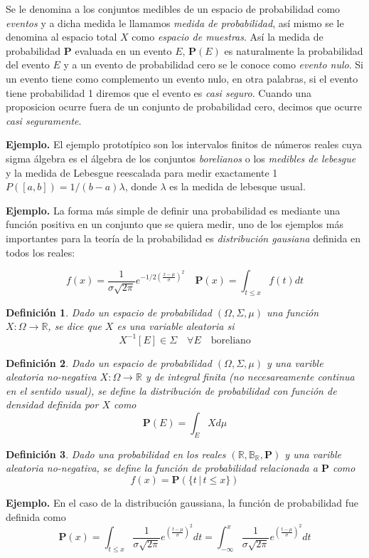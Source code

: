 \documentclass[letterpaper]{article}
\newtheorem{def.}{Definici\'on}[section]
\newcommand{\prob}{\textbf{P}}
\newcommand{\eje}{{\newline \noindent \sc \textbf{Ejemplo. }}}
\newcommand{\om}{\ensuremath{\Omega}}
\newcommand{\sig}{\ensuremath{\Sigma}}
\newcommand{\re}{\ensuremath{\mathbb R }}
\begin{document}
Se le denomina a los conjuntos medibles de un espacio de probabilidad como \emph{eventos} y a dicha medida le llamamos \emph{medida de probabilidad}, así mismo se le denomina al espacio total \(X\) como \emph{espacio de muestras}. Así la medida de probabilidad \textbf{P} evaluada en un evento \(E\), \(\textbf{P}(E)\) es naturalmente la probabilidad del evento \(E\) y a un evento de probabilidad cero se le conoce como \emph{evento nulo}. Si un evento tiene como complemento un evento nulo, en otra palabras, si el evento tiene probabilidad 1 diremos que el evento es \emph{casi seguro}. Cuando una proposicion ocurre fuera de un conjunto de probabilidad cero, decimos que ocurre \emph{casi seguramente}.

\eje El ejemplo prototípico son los intervalos finitos de números reales cuya sigma álgebra es el álgebra de los conjuntos \emph{borelianos} o los \emph{medibles de lebesgue} y la medida de Lebesgue reescalada para medir exactamente 1 \(P([a,b])=1/(b-a)\lambda\), donde \(\lambda\) es la medida de lebesque usual.

\eje La forma más simple de definir una probabilidad es mediante una función positiva en un conjunto que se quiera medir, uno de los ejemplos más importantes para la teoría de la probabilidad es \emph{distribución gausiana} definida en todos los reales:

\[
    f(x)=\frac{1}{\sigma\sqrt{2\pi}}e^{-1/2(\frac{x-\mu}{\sigma})^2}\quad \prob(x)=\int_{t\leq x}f(t)dt
\]

\begin{def.}
Dado un espacio de probabilidad \((\om,\sig,\mu)\) una función \(X:\om\rightarrow \re\), se dice que \(X\) es una variable aleatoria si
\[
    X^{-1}[E]\in\sig\quad\forall E \quad\text{boreliano}
\]
\end{def.}
\begin{def.}
Dado un espacio de probabilidad \((\om,\sig,\mu)\) y una varible aleatoria no-negativa \(X:\om\rightarrow \re\) y de integral finita (no necesareamente continua en el sentido usual), se define la \emph{distribución de probabilidad} con función de densidad definida por \(X\) como
\[
\prob(E)=\int_E Xd\mu
\]
\end{def.}

\begin{def.}
Dado una probabilidad en los reales \((\re,\mathbb{B}_{\re},\prob)\) y una varible aleatoria no-negativa, se define la \emph{función de probabilidad} relacionada a \(\prob\) como
\[
        f(x)=\prob(\{t\,|\,t\leq x\})
\]
\end{def.}
\eje En el caso de la distribución gaussiana, la función de probabilidad fue definida como
\[
    \prob(x)=\int_{t\leq x}\frac{1}{\sigma\sqrt{2\pi}}e^{(\frac{t-\mu}{\sigma})^2}dt =
    \int_{-\infty}^{x}\frac{1}{\sigma\sqrt{2\pi}}e^{(\frac{t-\mu}{\sigma})^2}dt
\]
\end{document}
